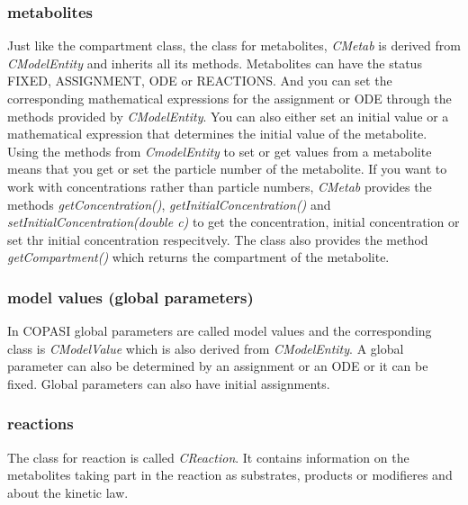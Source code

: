 \documentclass[a4,12pt]{article}
\begin{document}
\subsubsection{metabolites}
Just like the compartment class, the class for metabolites, \textit{CMetab} is derived from \textit{CModelEntity} and inherits all its methods.
Metabolites can have the status FIXED, ASSIGNMENT, ODE or REACTIONS. And you can set the corresponding mathematical expressions for the assignment or ODE through the methods provided by \textit{CModelEntity}. You can also either set an initial value or a mathematical expression that determines the initial value of the metabolite. Using the methods from \textit{CmodelEntity} to set or get values from a metabolite means that you get or set the particle number of the metabolite. If you want to work with concentrations rather than particle numbers, \textit{CMetab} provides the methods \textit{getConcentration()}, \textit{getInitialConcentration()} and \textit{setInitialConcentration(double c)} to get the concentration, initial concentration or set thr initial concentration respecitvely. The class also provides the method \textit{getCompartment()} which returns the compartment of the metabolite.

\subsubsection{model values (global parameters)}
In COPASI global parameters are called model values and the corresponding class is \textit{CModelValue} which is also derived from \textit{CModelEntity}. A global parameter can also be determined by an assignment or an ODE or it can be fixed. Global parameters can also have initial assignments.

\subsubsection{reactions}
The class for reaction is called \textit{CReaction}. It contains information on the metabolites taking part in the reaction as substrates, products or modifieres and about the kinetic law.
\end{document}
